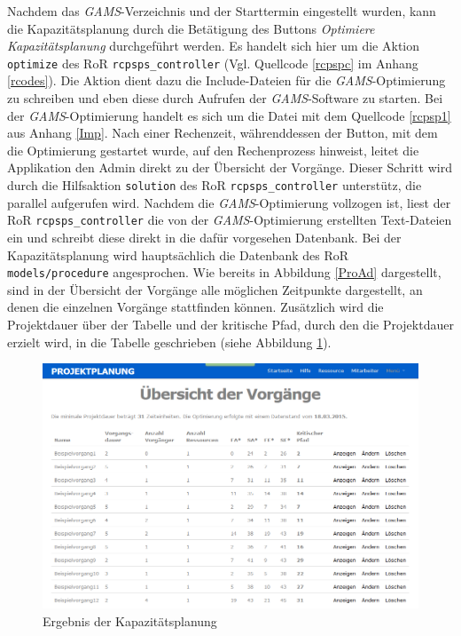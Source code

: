 \documentclass[a4paper,12pt,parskip,bibtotoc,liststotoc]{article}
\begin{document}
Nachdem das \textit{GAMS}-Verzeichnis und der Starttermin eingestellt wurden, kann die Kapazitätsplanung durch die Betätigung des Buttons \textit{Optimiere Kapazitätsplanung} durchgeführt werden. Es handelt sich hier um die Aktion \texttt{optimize} des RoR \texttt{rcpsps\_controller} (Vgl. Quellcode \ref{rcpspc} im Anhang \ref{rcodes}). Die Aktion dient dazu die Include-Dateien für die \textit{GAMS}-Optimierung zu schreiben und eben diese durch Aufrufen der \textit{GAMS}-Software zu starten. Bei der \textit{GAMS}-Optimierung handelt es sich um die Datei mit dem Quellcode \ref{rcpsp1} aus Anhang \ref{Imp}. Nach einer Rechenzeit, währenddessen der Button, mit dem die Optimierung gestartet wurde, auf den Rechenprozess hinweist, leitet die Applikation den Admin direkt zu der Übersicht der Vorgänge. Dieser Schritt wird durch die Hilfsaktion \texttt{solution} des RoR \texttt{rcpsps\_controller} unterstütz, die parallel aufgerufen wird. Nachdem die \textit{GAMS}-Optimierung vollzogen ist, liest der RoR \texttt{rcpsps\_controller} die von der \textit{GAMS}-Optimierung erstellten Text-Dateien ein und schreibt diese direkt in die dafür vorgesehen Datenbank. Bei der Kapazitätsplanung wird hauptsächlich die Datenbank des RoR \texttt{models/procedure} angesprochen. Wie bereits in Abbildung \ref{ProAd} dargestellt, sind in der Übersicht der Vorgänge alle möglichen Zeitpunkte dargestellt, an denen die einzelnen Vorgänge stattfinden können.  Zusätzlich wird die Projektdauer über der Tabelle und der kritische Pfad, durch den die Projektdauer erzielt wird, in die Tabelle geschrieben (siehe Abbildung \ref{Kap}).
\begin{figure}[h!]
  \begin{center}
    \includegraphics[width=120mm]{Bilder/Kapazitaetsplanung.png}
    \caption{Ergebnis der Kapazitätsplanung}  \label{Kap}
  \end{center}
\end{figure}
\end{document}
